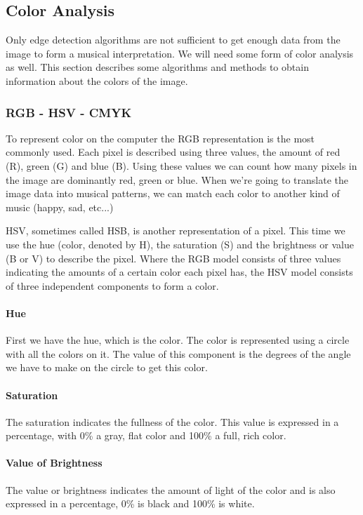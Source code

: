 \documentclass[12pt]{article}
\begin{document}
\subsection{Color Analysis}
Only edge detection algorithms are not sufficient to get enough data from the image to form a musical interpretation. We will need some form of color analysis as well. This section describes some algorithms and methods to obtain information about the colors of the image.

\subsubsection{RGB - HSV - CMYK}
To represent color on the computer the RGB representation is the most commonly used. Each pixel is described using three values, the amount of red (R), green (G) and blue (B). Using these values we can count how many pixels in the image are dominantly red, green or blue. When we're going to translate the image data into musical patterns, we can match each color to another kind of music (happy, sad, etc...)
\newline

HSV, sometimes called HSB, is another representation of a pixel. This time we use the hue (color, denoted by H), the saturation (S) and the brightness or value (B or V) to describe the pixel. Where the RGB model consists of three values indicating the amounts of a certain color each pixel has, the HSV model consists of three independent components to form a color. 
\newline

\paragraph{Hue} First we have the hue, which is the color. The color is represented using a circle with all the colors on it. The value of this component is the degrees of the angle we have to make on the circle to get this color.  

\paragraph{Saturation} The saturation indicates the fullness of the color. This value is expressed in a percentage, with 0\% a gray, flat color and 100\%  a full, rich color.

\paragraph {Value of Brightness} The value or brightness indicates the amount of light of the color and is also expressed in a percentage, 0\% is black and 100\% is white.
\end{document}
